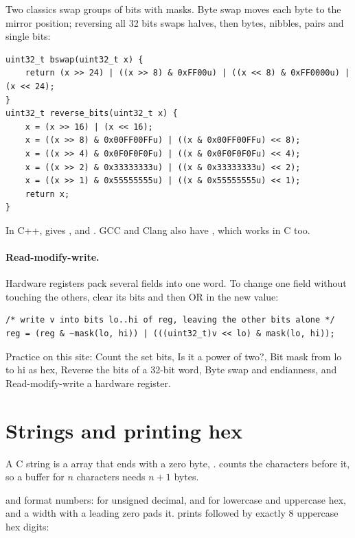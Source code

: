 Two classics swap groups of bits with masks. Byte swap moves each byte to the mirror position; reversing all 32 bits swaps halves, then bytes, nibbles, pairs and single bits:

\begin{lstlisting}
uint32_t bswap(uint32_t x) {
    return (x >> 24) | ((x >> 8) & 0xFF00u) | ((x << 8) & 0xFF0000u) | (x << 24);
}
uint32_t reverse_bits(uint32_t x) {
    x = (x >> 16) | (x << 16);
    x = ((x >> 8) & 0x00FF00FFu) | ((x & 0x00FF00FFu) << 8);
    x = ((x >> 4) & 0x0F0F0F0Fu) | ((x & 0x0F0F0F0Fu) << 4);
    x = ((x >> 2) & 0x33333333u) | ((x & 0x33333333u) << 2);
    x = ((x >> 1) & 0x55555555u) | ((x & 0x55555555u) << 1);
    return x;
}
\end{lstlisting}

In C++,  gives ,  and . GCC and Clang also have , which works in C too.

\paragraph{Read-modify-write.} Hardware registers pack several fields into one word. To change one field without touching the others, clear its bits and then OR in the new value:

\begin{lstlisting}
/* write v into bits lo..hi of reg, leaving the other bits alone */
reg = (reg & ~mask(lo, hi)) | (((uint32_t)v << lo) & mask(lo, hi));
\end{lstlisting}

Practice on this site: Count the set bits, Is it a power of two?, Bit mask from lo to hi as hex, Reverse the bits of a 32-bit word, Byte swap and endianness, and Read-modify-write a hardware register.

\section{Strings and printing hex}

A C string is a  array that ends with a zero byte, .  counts the characters before it, so a buffer for $n$ characters needs $n + 1$ bytes.

 and  format numbers:  for unsigned decimal,  and  for lowercase and uppercase hex, and a width with a leading zero pads it.  prints  followed by exactly 8 uppercase hex digits:

